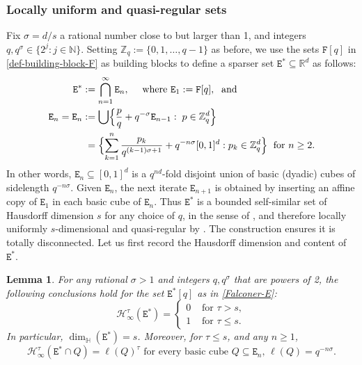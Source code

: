\documentclass[a4paper,11pt]{amsart}
\newtheorem{lem}[thm]{\bf Lemma}
\numberwithin{equation}{section}
\begin{document}
\subsubsection{Locally uniform and quasi-regular sets} \label{uniform-and-quasiregular-section} 
Fix $\sigma = d/s$ a rational number close to but larger than 1, and integers $q, q^{\sigma} \in \{2^{j}: j \in \mathbb N\}$. Setting $\mathbb Z_{q} := \{0, 1, \ldots, q - 1\}$ as before, we use the sets $\mathtt F[q]$ in \eqref{def-building-block-F} as building blocks to define a sparser set $\mathtt E^{\ast} \subseteq \mathbb R^d$ as follows: 
\begin{align} \label{Falconer-E} 
\mathtt E^{\ast} &:= \bigcap_{n=1}^{\infty} \mathtt E_n, \quad \text{ where } \mathtt E_1 := \mathtt F[q], \; \text{ and } \\ 
\mathtt E_{n} = \mathtt E_n&:= \bigcup \Bigl\{\frac{p}{q} + q^{-\sigma} \mathtt E_{n-1}: \; p \in \mathbb Z_q^d \Bigr\} \nonumber \\ &\;= \Bigl\{\sum_{k=1}^{n} \frac{p_k}{q^{(k-1)\sigma + 1}} + q^{-n\sigma}[0,1]^d : p_k \in \mathbb Z_q^d \Bigr\} \; \text{ for } n \geq 2. \label{self-similar-Falconer}
\end{align}  
In other words, $\mathtt E_n \subseteq [0,1]^d$ is a $q^{nd}$-fold disjoint union of basic (dyadic) cubes of sidelength $q^{-n \sigma}$. Given $\mathtt E_n$, the next iterate $\mathtt E_{n+1}$ is obtained by inserting an affine copy of $\mathtt E_1$ in each basic cube of $\mathtt E_n$. Thus $\mathtt E^{\ast}$ is a bounded self-similar set of Hausdorff dimension $s$ for any choice of $q$, in the sense of \cite{Strichartz-Asymptotics}, and therefore locally uniformly $s$-dimensional and quasi-regular by \cite[Theorem 5.8]{Strichartz-Asymptotics}. The construction ensures it is totally disconnected. Let us first record the Hausdorff dimension and content of $\mathtt E^{\ast}$. 
\begin{lem} \label{Falconer-example-content-lemma}
For any rational $\sigma > 1$ and integers $q, q^{\sigma}$ that are powers of 2,  the following conclusions hold for the set $\mathtt E^{\ast}[q]$ as in \eqref{Falconer-E}: 
\begin{equation} \label{Falconer-example-content}  
\mathcal H_{\infty}^{\tau}(\mathtt E^{\ast}) =  \begin{cases} 0 &\text{ for } \tau > s, \\ 1 &\text{ for } \tau \leq s.  \end{cases}  \end{equation} 
In particular, $\dim_{\mathbb H}(\mathtt E^{\ast}) = s$. Moreover, for $\tau \leq s$, and any $n \geq 1$, 
\begin{equation}  \mathcal H_{\infty}^{\tau}(\mathtt E^{\ast} \cap Q) = \ell(Q)^{\tau} \text{ for every basic cube $Q \subseteq \mathtt E_n$, $\ell(Q) = q^{-n\sigma}$.} \label{maximal-density} \end{equation}   
\end{lem} 
\end{document}

